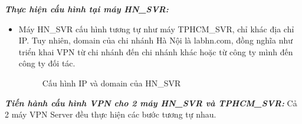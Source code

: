   \textbf{\textit{Thực hiện cấu hình tại máy HN\_SVR:}}
  \begin{itemize}
      \item Máy HN\_SVR cấu hình tương tự như máy TPHCM\_SVR, chỉ khác địa chỉ IP.  Tuy nhiên, domain của chi nhánh Hà Nội là labhn.com, đồng nghĩa như triển khai VPN từ chi nhánh đến chi nhánh khác hoặc từ công ty mình đến công ty đối tác.

        \begin{figure}[htbp]
            \hfill
            \hfill
            \caption{Cấu hình IP và domain của HN\_SVR}
        \end{figure}

  \end{itemize}
  \textbf{\textit{Tiến hành cấu hình VPN cho 2 máy HN\_SVR và TPHCM\_SVR:}} Cả 2 máy VPN Server đều thực hiện các bước tương tự nhau.
